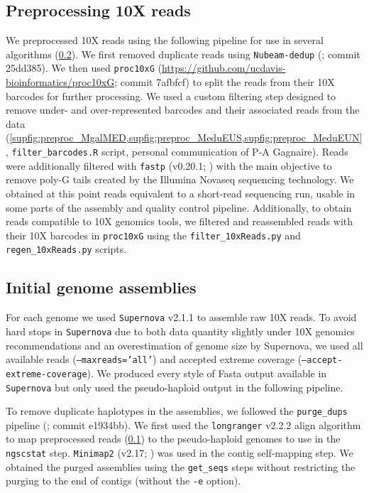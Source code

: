 \documentclass[11pt, a4paper]{article}
\begin{document}
\subsection{Preprocessing 10X reads}\label{preproc}

We preprocessed 10X reads using the following pipeline for use in several algorithms (\cref{draft_asm}).
We first removed duplicate reads using \texttt{Nubeam-dedup} (\cite{Dai2020}; commit 25dd385).
We then used \texttt{proc10xG} (\url{https://github.com/ucdavis-bioinformatics/proc10xG}; commit 7afbfcf) to split the reads from their 10X barcodes for further processing.
We used a custom filtering step designed to remove under- and over-repre\-sented barcodes and their associated reads from the data (\cref{supfig:preproc_MgalMED,supfig:preproc_MeduEUS,supfig:preproc_MeduEUN}, \texttt{filter\_barcodes.R} script, personal communication of P-A Gagnaire).
Reads were additionally filtered with \texttt{fastp} (v0.20.1; \cite{Chen2018}) with the main objective to remove poly-G tails created by the Illumina Novaseq sequencing technology.
We obtained at this point reads equivalent to a short-read sequencing run, usable in some parts of the assembly and quality control pipeline.
Additionally, to obtain reads compatible to 10X genomics tools, we filtered and reassembled reads with their 10X barcodes in \texttt{proc10xG} using the \texttt{filter\_10xReads.py} and \texttt{regen\_10xReads.py} scripts.

\subsection{Initial genome assemblies}\label{draft_asm}

For each genome we used \texttt{Supernova} v2.1.1 \parencite{Weisenfeld2017} to assemble raw 10X reads.
To avoid hard stops in \texttt{Supernova} due to both data quantity slightly under 10X genomics recommendations and an overestimation of genome size by Supernova, we used all available reads (\texttt{--maxreads='all'}) and accepted extreme coverage (\texttt{--accept-extreme-coverage}).
We produced every style of Fasta output available in \texttt{Supernova} but only used the pseudo-haploid output in the following pipeline.

To remove duplicate haplotypes in the assemblies, we followed the \texttt{purge\_dups} pipeline (\cite{Guan2020}; commit e1934bb).
We first used the \texttt{longranger} v2.2.2 align algorithm to map preprocessed reads (\cref{preproc}) to the pseudo-haploid genomes to use in the \texttt{ngscstat} step.
\texttt{Minimap2} (v2.17; \cite{Li2017}) was used in the contig self-mapping step.
We obtained the purged assemblies using the \texttt{get\_seqs} steps without restricting the purging to the end of contigs (without the \texttt{-e} option).
\end{document}
